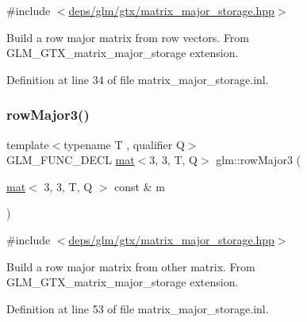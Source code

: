 {\ttfamily \#include $<$\hyperlink{matrix__major__storage_8hpp}{deps/glm/gtx/matrix\+\_\+major\+\_\+storage.\+hpp}$>$}

Build a row major matrix from row vectors. From G\+L\+M\+\_\+\+G\+T\+X\+\_\+matrix\+\_\+major\+\_\+storage extension. 

Definition at line 34 of file matrix\+\_\+major\+\_\+storage.\+inl.

\mbox{\label{group__gtx__matrix__major__storage_gad8a3a50ab47bbe8d36cdb81d90dfcf77}} 
\subsubsection{\texorpdfstring{row\+Major3()}{rowMajor3()}\hspace{0.1cm}{\footnotesize\ttfamily [2/2]}}
{\footnotesize\ttfamily template$<$typename T , qualifier Q$>$ \\
G\+L\+M\+\_\+\+F\+U\+N\+C\+\_\+\+D\+E\+CL \hyperlink{structglm_1_1mat}{mat}$<$3, 3, T, Q$>$ glm\+::row\+Major3 (\begin{DoxyParamCaption}\item[{\hyperlink{structglm_1_1mat}{mat}$<$ 3, 3, T, Q $>$ const \&}]{m }\end{DoxyParamCaption})}



{\ttfamily \#include $<$\hyperlink{matrix__major__storage_8hpp}{deps/glm/gtx/matrix\+\_\+major\+\_\+storage.\+hpp}$>$}

Build a row major matrix from other matrix. From G\+L\+M\+\_\+\+G\+T\+X\+\_\+matrix\+\_\+major\+\_\+storage extension. 

Definition at line 53 of file matrix\+\_\+major\+\_\+storage.\+inl.

\mbox{\label{group__gtx__matrix__major__storage_ga9636cd6bbe2c32a8d0c03ffb8b1ef284}} 
